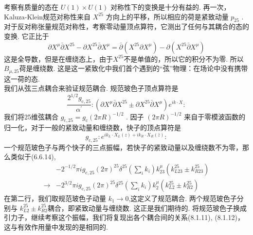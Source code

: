 考察有质量的态在 $U(1) \times U(1)$ 对称性下的变换是十分有益的. 再一次，Kaluza-Klein规范对称性来自 $X^{25}$ 方向上的平移，所以相应的荷是紧致动量 $p_{25} $ . 对于反对称张量规范对称性，考察零动量顶点算符，它测出了任何与其耦合的态的变换. 它正比于
\begin{equation}
	\partial X^{\mu} \bar{\partial} X^{25}-\partial X^{25} \bar{\partial} X^{\mu}=\bar{\partial}\left(X^{25} \partial X^{\mu}\right)-\partial\left(X^{25} \bar{\partial} X^{\mu}\right)
\end{equation}
这是全导数，但是在缠绕态上，由于$X^{25}$不是单值的，所以它的积分不为零. 所以 $B_{\mu, 25}$荷是缠绕数. 这是这一紧致化中我们首个遇到的“弦”物理：在场论中没有携带这一荷的态.\\
我们从弦三点耦合来验证规范耦合. 规范玻色子顶点算符是
\begin{equation}
	\frac{2^{1 / 2} g_{\mathrm{c}, 25}}{\alpha^{\prime}}:\left(\partial X^{\mu} \bar{\partial} X^{25} \pm \partial X^{25} \bar{\partial} X^{\mu}\right) e^{i k \cdot X}:
\end{equation}
我们将25维弦耦合 $g_{\mathrm{c}, 25}=g_{\mathrm{c}}(2 \pi R)^{-1 / 2}$ . 因子 $(2 \pi R)^{-1 / 2}$ 来自于零模波函数的归一化，对于一般的紧致动量和缠绕数，快子的顶点算符是
\begin{equation}
	g_{\mathrm{c}, 25}: e^{i k_{L} \cdot X_{L}(z)+i k_{R} \cdot X_{R}(\bar{z})}:
\end{equation}
一个规范玻色子与两个快子的三点振幅，若快子的紧致动量以及缠绕数不为零，那么类似于(6.6.14),
\begin{equation}
	\begin{aligned}
		&-2^{-1 / 2} \pi i g_{\mathrm{c}, 25}(2 \pi)^{25} \delta^{25}\left(\sum_{i} k_{i}\right) k_{23}^{\mu}\left(k_{L 23}^{25} \pm k_{R 23}^{25}\right) \\
		\rightarrow &-2^{3 / 2} \pi i g_{\mathrm{c}, 25}(2 \pi)^{25} \delta^{25}\left(\sum_{i} k_{i}\right) k_{2}^{\mu}\left(k_{L 2}^{25} \pm k_{R 2}^{25}\right)
	\end{aligned}
\end{equation}
在第二行，我们取规范玻色子动量 $k_{1} \rightarrow 0$,这定义了规范耦合. 两个规范玻色子分别与 $k_{L 2}^{25} \pm k_{R 2}^{25}$耦合，即紧致动量与缠绕数. 这正是我们期待的. 将规范玻色子换成引力子，继续考察这个振幅，我们将复现出各个耦合间的关系(8.1.11), (8.1.12)，这与有效作用量中发现的是相同的.

